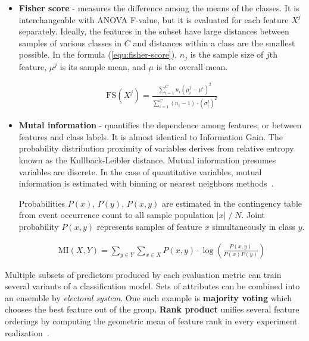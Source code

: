 \begin{itemize}
\item \textbf{Fisher score} - measures the difference among the means of the classes. It is interchangeable with ANOVA F-value, but it is evaluated for each feature $X^j$ separately. Ideally, the features in the subset have large distances between samples of various classes in $C$ and distances within a class are the smallest possible. In the formula (\ref{equ:fisher-score}), $n_j$ is the sample size of $j$th feature, $\mu^j$ is its sample mean, and $\mu$ is the overall mean.

\begin{ceqn}\begin{align}
\mathrm{FS}(X^j) = \frac{\sum_{i=1}^{C} n_i(\mu_i^j - \mu^i)^2}{\sum_{i=1}^{C} (n_i - 1) \cdot (\sigma_i^j)^2}
\label{equ:fisher-score}
\end{align}\end{ceqn}

\item \textbf{Mutal information} - quantifies the dependence among features, or between features and class labels. It is almost identical to Information Gain. The probability distribution proximity of variables derives from relative entropy known as the Kullback-Leibler distance. Mutual information presumes variables are discrete. In the case of quantitative variables, mutual information is estimated with binning or nearest neighbors methods~\cite{ross_mutual_2014}.

Probabilities $P(x)$, $P(y)$, $P(x, y)$ are estimated in the contingency table from event occurrence count to all sample population $|x|\;/\;N$. Joint probability $P(x, y)$ represents samples of feature $x$ simultaneously in class $y$.

\begin{ceqn}\begin{align}
\mathrm{MI}(X, Y) = \sum_{y \in Y} \sum_{x \in X} P(x, y) \cdot \log\left(\frac{P(x, y)}{P(x)P(y)}\right)
\end{align}\end{ceqn}
\end{itemize}

Multiple subsets of predictors produced by each evaluation metric can train several variants of a classification model. Sets of attributes can be combined into an ensemble by \emph{electoral system}. One such example is \textbf{majority voting} which chooses the best feature out of the group. \textbf{Rank product} unifies several feature orderings by computing the geometric mean of feature rank in every experiment realization~\cite{breitling_rank_2004}.
